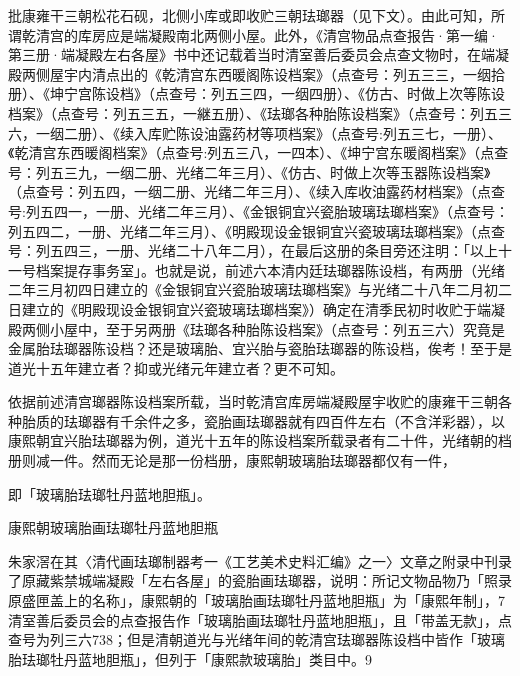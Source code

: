 \noindent 批康雍干三朝松花石砚，北侧小库或即收贮三朝珐瑯器（见下文）。由此可知，所谓乾清宫的库房应是端凝殿南北两侧小屋。此外，《清宫物品点查报告·第一编·第三册·端凝殿左右各屋》书中还记载着当时清室善后委员会点查文物时，在端凝殿两侧屋宇内清点出的《乾清宫东西暖阁陈设档案》（点查号：列五三三，一𬘡拾册）、《坤宁宫陈设档》（点查号：列五三四，一𬘡四册）、《仿古、时做上次等陈设档案》（点查号：列五三五，一継五册）、《珐瑯各种胎陈设档案》（点查号：列五三六，一𬘡二册）、《续入库贮陈设油露药材等项档案》（点查号:列五三七，一册）、《乾清宫东西暖阁档案》（点查号:列五三八，一四本）、《坤宁宫东暖阁档案》（点查号：列五三九，一𬘡二册、光绪二年三月）、《仿古、时做上次等玉器陈设档案》（点查号：列五四，一𬘡二册、光绪二年三月）、《续入库收油露药材档案》（点查号:列五四一，一册、光绪二年三月）、《金银铜宜兴瓷胎玻璃珐瑯档案》（点查号：列五四二，一册、光绪二年三月）、《明殿现设金银铜宜兴瓷玻璃珐瑯档案》（点查号：列五四三，一册、光绪二十八年二月），在最后这册的条目旁还注明：「以上十一号档案提存事务室」。也就是说，前述六本清内廷珐瑯器陈设档，有两册（光绪二年三月初四日建立的《金银铜宜兴瓷胎玻璃珐瑯档案》与光绪二十八年二月初二日建立的《明殿现设金银铜宜兴瓷玻璃珐瑯档案》）确定在清季民初时收贮于端凝殿两侧小屋中，至于另两册《珐瑯各种胎陈设档案》（点查号：列五三六）究竟是金属胎珐瑯器陈设档？还是玻璃胎、宜兴胎与瓷胎珐瑯器的陈设档，俟考！至于是道光十五年建立者？抑或光绪元年建立者？更不可知。

依据前述清宫瑯器陈设档案所载，当时乾清宫库房端凝殿屋宇收贮的康雍干三朝各种胎质的珐瑯器有千余件之多，瓷胎画珐瑯器就有四百件左右（不含洋彩器），以康熙朝宜兴胎珐瑯器为例，道光十五年的陈设档案所载录者有二十件，光绪朝的档册则减一件。然而无论是那一份档册，康熙朝玻璃胎珐瑯器都仅有一件，

\vfill
\begin{BookNotes}
\end{BookNotes}

\noindent 即「玻璃胎珐瑯牡丹蓝地胆瓶」。

康熙朝玻璃胎画珐瑯牡丹蓝地胆瓶

朱家滘在其〈清代画珐瑯制器考一《工艺美术史料汇编》之一〉文章之附录中刊录了原藏紫禁城端凝殿「左右各屋」的瓷胎画珐瑯器，说明：所记文物品物乃「照录原盛匣盖上的名称」，康熙朝的「玻璃胎画珐瑯牡丹蓝地胆瓶」为「康熙年制」，7清室善后委员会的点查报告作「玻璃胎画珐瑯牡丹蓝地胆瓶」，且「带盖无款」，点查号为列三六738；但是清朝道光与光绪年间的乾清宫珐瑯器陈设档中皆作「玻璃胎珐瑯牡丹蓝地胆瓶」，但列于「康熙款玻璃胎」类目中。9

